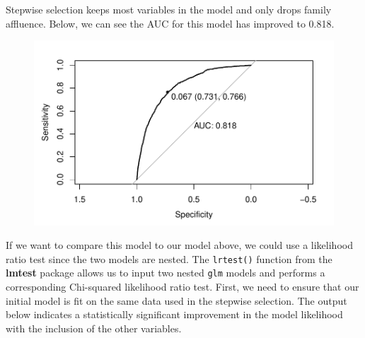 \documentclass[
  letterpaper,
]{krantz}
\makeatletter
\newenvironment{Shaded}{\begin{snugshade}}{\end{snugshade}}
\newcommand{\AttributeTok}[1]{\textcolor[rgb]{0.40,0.45,0.13}{#1}}
\newcommand{\ConstantTok}[1]{\textcolor[rgb]{0.56,0.35,0.01}{#1}}
\newcommand{\DecValTok}[1]{\textcolor[rgb]{0.68,0.00,0.00}{#1}}
\newcommand{\FunctionTok}[1]{\textcolor[rgb]{0.28,0.35,0.67}{#1}}
\newcommand{\NormalTok}[1]{\textcolor[rgb]{0.00,0.23,0.31}{#1}}
\newcommand{\OtherTok}[1]{\textcolor[rgb]{0.00,0.23,0.31}{#1}}
\newcommand{\SpecialCharTok}[1]{\textcolor[rgb]{0.37,0.37,0.37}{#1}}
\newcommand{\StringTok}[1]{\textcolor[rgb]{0.13,0.47,0.30}{#1}}
\newenvironment{kframe}{%
\medskip{}
\setlength{\fboxsep}{.8em}
 \def\at@end@of@kframe{}%
 \ifinner\ifhmode%
  \def\at@end@of@kframe{\end{minipage}}%
  \begin{minipage}{\columnwidth}%
 \fi\fi%
 \def\FrameCommand##1{\hskip\@totalleftmargin \hskip-\fboxsep
 \colorbox{shadecolor}{##1}\hskip-\fboxsep
     \hskip-\linewidth \hskip-\@totalleftmargin \hskip\columnwidth}%
 \MakeFramed {\advance\hsize-\width
   \@totalleftmargin\z@ \linewidth\hsize
   \@setminipage}}%
 {\par\unskip\endMakeFramed%
 \at@end@of@kframe}
\renewenvironment{Shaded}{\begin{kframe}}{\end{kframe}}
\makeatother
\begin{document}
Stepwise selection keeps most variables in the model and only drops
family affluence. Below, we can see the AUC for this model has improved
to 0.818.

\begin{Shaded}
\end{Shaded}

\begin{figure}[H]

{\centering \includegraphics[width=1\textwidth,height=\textheight]{book/11_logistic_regression_files/figure-pdf/unnamed-chunk-21-1.pdf}

}

\end{figure}

If we want to compare this model to our model above, we could use a
likelihood ratio test since the two models are nested. The
\texttt{lrtest()} function from the \textbf{lmtest} package allows us to
input two nested \texttt{glm} models and performs a corresponding
Chi-squared likelihood ratio test. First, we need to ensure that our
initial model is fit on the same data used in the stepwise selection.
The output below indicates a statistically significant improvement in
the model likelihood with the inclusion of the other variables.
\end{document}
